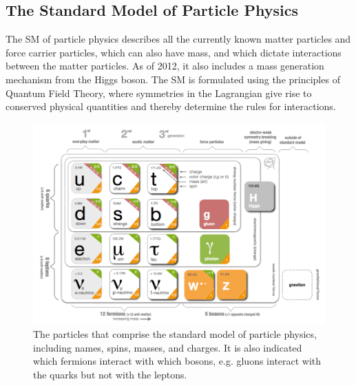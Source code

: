 \FloatBarrier
\subsection{The Standard Model of Particle Physics}
The \ac{SM} of particle physics describes all the currently known matter particles and force carrier particles, which can also have mass, and which dictate interactions between the matter particles. As of 2012, it also includes a mass generation mechanism from the Higgs boson. The \ac{SM} is formulated using the principles of Quantum Field Theory, where symmetries in the Lagrangian give rise to conserved physical quantities and thereby determine the rules for interactions.

\begin{figure}[htbp]
\begin{center}
\includegraphics[width=\textwidth]{figures/theory/sm.png}
\caption{The particles that comprise the standard model of particle physics, including names, spins, masses, and charges. It is also indicated which fermions interact with which bosons, e.g. gluons interact with the quarks but not with the leptons. }
\label{fig:sm}
\end{center}
\end{figure}


